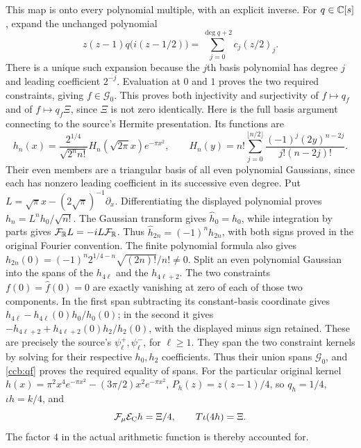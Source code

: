 This map is onto every polynomial multiple, with an explicit inverse.
For $q\in\mathbb C[s]$, expand the unchanged polynomial
\begin{equation}
 z(z-1)q\bigl(i(z-1/2)\bigr)=\sum_{j=0}^{\deg q+2}c_j(z/2)_j.
 \label{ccb:triangular-inverse}
\end{equation}
There is a unique such expansion because the $j$th basis polynomial
has degree $j$ and leading coefficient $2^{-j}$. Evaluation at $0$
and $1$ proves the two required constraints, giving $f\in\mathcal G_0$.
This proves both injectivity and surjectivity of
$f\mapsto q_f$ and of $f\mapsto q_f\Xi$, since $\Xi$ is not zero
identically. Here is the full basis argument connecting to the source's
Hermite presentation. Its functions are
\[
h_n(x)=\frac{2^{1/4}}{\sqrt{2^n n!}}
 H_n(\sqrt{2\pi}x)e^{-\pi x^2},\qquad
H_n(y)=n!\sum_{j=0}^{\lfloor n/2\rfloor}
 \frac{(-1)^j(2y)^{n-2j}}{j!(n-2j)!}.
\]
Their even members are a triangular basis of all even polynomial
Gaussians, since each has nonzero leading coefficient in its successive
even degree. Put $L=\sqrt\pi x-(2\sqrt\pi)^{-1}\partial_x$.
Differentiating the displayed polynomial proves
$h_n=L^nh_0/\sqrt{n!}$. The Gaussian transform gives
$\widehat h_0=h_0$, while integration by parts gives
$\mathcal F_{\mathbb R}L=-iL\mathcal F_{\mathbb R}$. Thus
$\widehat h_{2n}=(-1)^nh_{2n}$, with both signs proved in the
original Fourier convention. The finite polynomial formula also gives
$h_{2n}(0)=(-1)^n2^{1/4-n}\sqrt{(2n)!}/n!\ne0$.
Split an even polynomial Gaussian into the spans of the $h_{4\ell}$
and the $h_{4\ell+2}$. The two constraints $f(0)=\widehat f(0)=0$
are exactly vanishing at zero of each of those two components.
In the first span subtracting its constant-basis coordinate gives
$h_{4\ell}-h_{4\ell}(0)h_0/h_0(0)$; in the second it gives
$-h_{4\ell+2}+h_{4\ell+2}(0)h_2/h_2(0)$, with the displayed
minus sign retained. These are precisely the source's
$\psi_\ell^+,\psi_\ell^-$, for $\ell\ge1$. They span the two
constraint kernels by solving for their respective $h_0,h_2$
coefficients. Thus their union spans $\mathcal G_0$, and
\eqref{ccb:qf} proves the required equality of spans.
For the particular original kernel
$h(x)=\pi^2x^4e^{-\pi x^2}-(3\pi/2)x^2e^{-\pi x^2}$,
$P_h(z)=z(z-1)/4$, so $q_h=1/4$, $\iota h=k/4$, and
\begin{equation}
 \mathcal F_\mu\mathcal E_{\rm C}h=\Xi/4,
 \qquad T\iota(4h)=\Xi.
 \label{ccb:original-kernel-factor}
\end{equation}
The factor $4$ in the actual arithmetic function is thereby accounted for.

